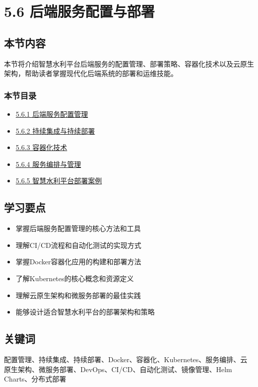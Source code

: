 \section{5.6
后端服务配置与部署}\label{ux540eux7aefux670dux52a1ux914dux7f6eux4e0eux90e8ux7f72}

\subsection{本节内容}\label{ux672cux8282ux5185ux5bb9}

本节将介绍智慧水利平台后端服务的配置管理、部署策略、容器化技术以及云原生架构，帮助读者掌握现代化后端系统的部署和运维技能。

\subsubsection{本节目录}\label{ux672cux8282ux76eeux5f55}

\begin{itemize}
\tightlist
\item
  \href{section05-06/section05-06-01.md}{5.6.1 后端服务配置管理}
\item
  \href{section05-06/section05-06-02.md}{5.6.2 持续集成与持续部署}
\item
  \href{section05-06/section05-06-03.md}{5.6.3 容器化技术}
\item
  \href{section05-06/section05-06-04.md}{5.6.4 服务编排与管理}
\item
  \href{section05-06/section05-06-05.md}{5.6.5 智慧水利平台部署案例}
\end{itemize}

\subsection{学习要点}\label{ux5b66ux4e60ux8981ux70b9}

\begin{itemize}
\tightlist
\item
  掌握后端服务配置管理的核心方法和工具
\item
  理解CI/CD流程和自动化测试的实现方式
\item
  掌握Docker容器化应用的构建和部署方法
\item
  了解Kubernetes的核心概念和资源定义
\item
  理解云原生架构和微服务部署的最佳实践
\item
  能够设计适合智慧水利平台的部署架构和策略
\end{itemize}

\subsection{关键词}\label{ux5173ux952eux8bcd}

配置管理、持续集成、持续部署、Docker、容器化、Kubernetes、服务编排、云原生架构、微服务部署、DevOps、CI/CD、自动化测试、镜像管理、Helm
Charts、分布式部署
